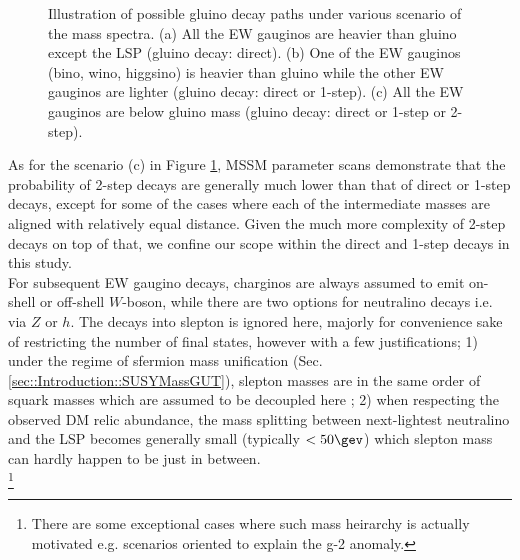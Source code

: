 \begin{figure}[h]
  \centering
    \caption{ 
Illustration of possible gluino decay paths under various scenario of the mass spectra. 
(a) All the EW gauginos are heavier than gluino except the LSP (gluino decay: direct).
(b) One of the EW gauginos (bino, wino, higgsino) is heavier than gluino 
while the other EW gauginos are lighter (gluino decay: direct or 1-step).
(c) All the EW gauginos are below gluino mass (gluino decay: direct or 1-step or 2-step).
\label{fig::Introduction::signal_massConfig} }
\end{figure}

As for the scenario (c) in Figure \ref{fig::Introduction::signal_massConfig}, MSSM parameter scans demonstrate that the probability of 2-step decays are generally much lower than that of direct or 1-step decays, except for some of the cases where each of the intermediate masses are aligned with relatively equal distance. Given the much more complexity of 2-step decays on top of that, we confine our scope within the direct and 1-step decays in this study. \\

For subsequent EW gaugino decays, charginos are always assumed to emit on-shell or off-shell $W$-boson, while there are two options for neutralino decays i.e. via $Z$ or $h$. The decays into slepton is ignored here, majorly for convenience sake of restricting the number of final states, however with a few justifications; 1) under the regime of sfermion mass unification (Sec. \ref{sec::Introduction::SUSYMassGUT}), slepton masses are in the same order of squark masses which are assumed to be decoupled here ; 2) when respecting the observed DM relic abundance, the mass splitting between next-lightest neutralino and the LSP becomes generally small (typically $<50\gev$) which slepton mass can hardly happen to be just in between. \\
\footnote{There are some exceptional cases where such mass heirarchy is actually motivated e.g. scenarios oriented to explain the g-2 anomaly.}

